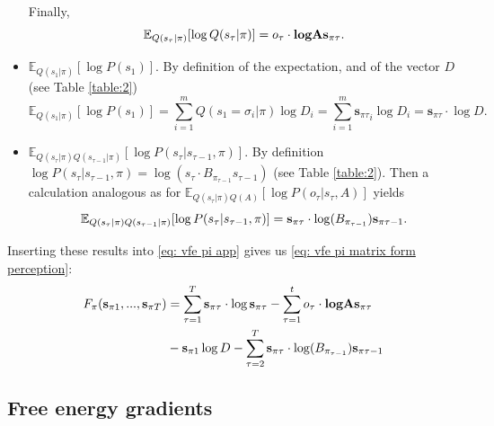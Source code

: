 \documentclass[review,12pt,authoryear]{elsarticle}
\newcommand{\E}{\mathbb E}
\begin{document}
\begin{itemize}
    Finally,
    \begin{equation*}
        \E_{Q(s_\tau |\pi)}[\log Q(s_\tau |\pi)] = o_\tau \cdot \textbf{log} \bold A\mathbf s_{\pi \tau}.
    \end{equation*}
    \item $\E_{Q(s_1 |\pi)}[\log P(s_1)]$. By definition of the expectation, and of the vector $D$ (see Table \ref{table:2})
    \begin{equation}
    \label{eq: initial state}
        \E_{Q(s_1 |\pi)}[\log P(s_1)]= \sum_{i=1}^m Q(s_1 =\sigma_i|\pi) \log D_i = \sum_{i=1}^m {\mathbf s_{\pi \tau}}_i \log D_i = {\mathbf s_{\pi \tau}} \cdot \log D.
    \end{equation}
    \item $\E_{Q(s_\tau |\pi)Q(s_{\tau-1} |\pi)}[\log P(s_\tau |s_{\tau-1},\pi)]$. By definition $\log P(s_\tau |s_{\tau-1},\pi)=\log \left(s_\tau \cdot B_{\pi_{\tau-1}} s_{\tau-1}\right)$ (see Table \ref{table:2}). Then a calculation analogous as for $\E_{Q(s_\tau |\pi)Q(A)}[\log P(o_{\tau}|s_{\tau},A)]$ yields
    \begin{equation}
    \label{eq: trans prob}
        \E_{Q(s_\tau |\pi)Q(s_{\tau-1} |\pi)}[\log P(s_\tau |s_{\tau-1},\pi)]= \bold s_{\pi \tau } \cdot \log (B_{\pi_{\tau-1}})\bold s_{\pi \tau-1 }.
    \end{equation}
\end{itemize}
Inserting %
these results into \eqref{eq: vfe pi app} gives us \eqref{eq: vfe pi matrix form perception}:
 \begin{equation}
 \label{eq: 7 in app}
  	    \begin{split}
        F_\pi(\bold s_{\pi 1},...,\bold s_{\pi T}) &= \sum_{\tau = 1}^T \bold s_{\pi \tau } \cdot \log \bold s_{\pi \tau } 
        - \sum_{\tau = 1}^t o_\tau \cdot \textbf{log} \bold A \bold s_{\pi \tau }\\
        &- \bold s_{\pi 1 } \log D- \sum_{\tau = 2}^T \bold s_{\pi \tau } \cdot \log (B_{\pi_{\tau-1}})\bold s_{\pi \tau-1 }
    \end{split}
\end{equation}

\subsection{Free energy gradients}
\end{document}
